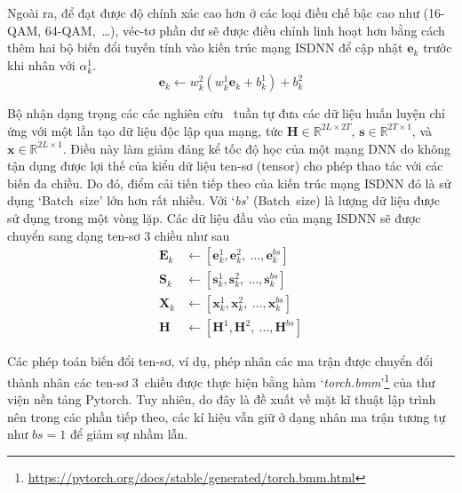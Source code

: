 Ngoài ra, để đạt được độ chính xác cao hơn ở các loại điều chế bậc cao như (16-QAM, 64-QAM,~\ldots), véc-tơ phần dư sẽ được điều chỉnh linh hoạt hơn bằng cách thêm hai bộ biến đổi tuyến tính vào kiến trúc mạng ISDNN để cập nhật $\mathbf{e}_k$ trước khi nhân với $\alpha^1_k$.
\begin{equation}
\mathbf{e}_k \leftarrow w^2_{k}\left(w^1_{k} \mathbf{e}_k+b^1_{k}\right)+b^2_{k}
\end{equation}

Bộ nhận dạng trọng các các nghiên cứu~\cite{Mandloi2017, Liao2020, Samuel2019} tuần tự đưa các dữ liệu huấn luyện chỉ ứng với một lần tạo dữ liệu độc lập qua mạng, tức $\mathbf{H} \in \mathbb{R}^{2L \times 2T}$, $\mathbf{s} \in \mathbb{R}^{2T \times 1}$, và $\mathbf{x} \in \mathbb{R}^{2L \times 1}$. Điều này làm giảm đáng kể tốc độ học của một mạng DNN do không tận dụng được lợi thế của kiểu dữ liệu ten-sơ (tensor) cho phép thao tác với các biến đa chiều. Do đó, điểm cải tiến tiếp theo của kiến trúc mạng ISDNN đó là sử dụng `Batch~size' lớn hơn rất nhiều. Với `\textit{bs}' (Batch~size) là lượng dữ liệu được sử dụng trong một vòng lặp. Các dữ liệu đầu vào của mạng ISDNN sẽ được chuyển sang dạng ten-sơ $3$ chiều như sau
\begin{subequations}
    \begin{align}
        \mathbf{E}_k &\leftarrow [\mathbf{e}_k^1, \mathbf{e}_k^2,~\ldots, \mathbf{e}_k^{bs}]\\
        \mathbf{S}_k &\leftarrow [\mathbf{s}_k^1, \mathbf{s}_k^2,~\ldots, \mathbf{s}_k^{bs}] \\
        \mathbf{X}_k &\leftarrow [\mathbf{x}_k^1, \mathbf{x}_k^2,~\ldots, \mathbf{x}_k^{bs}] \\
        \mathbf{H}   &\leftarrow [\mathbf{H}^1, \mathbf{H}^2,~\ldots, \mathbf{H}^{bs}]  
    \end{align}
\end{subequations}

Các phép toán biến đổi ten-sơ, ví dụ, phép nhân các ma trận được chuyển đổi thành nhân các ten-sơ $3$~chiều được thực hiện bằng hàm `\textit{torch.bmm}'\footnote{\url{https://pytorch.org/docs/stable/generated/torch.bmm.html}} của thư viện nền tảng Pytorch. Tuy nhiên, do đây là đề xuất về mặt kĩ thuật lập trình nên trong các phần tiếp theo, các kí hiệu vẫn giữ ở dạng nhân ma trận tương tự như $bs = 1$ để giảm sự nhầm lẫn.

